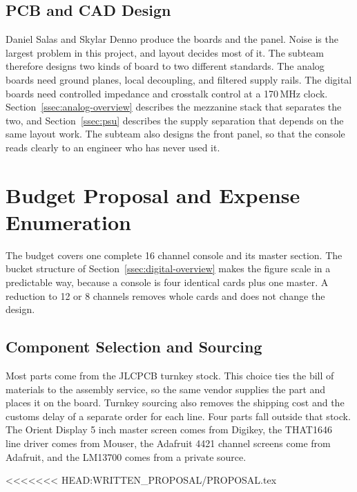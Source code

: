 \documentclass[11pt, letterpaper,titlepage]{article}
\begin{document}
\subsection{PCB and CAD Design}
\label{ssec:task-pcb}

Daniel Salas and Skylar Denno produce the boards and the panel. Noise is the
largest problem in this project, and layout decides most of it. The subteam
therefore designs two kinds of board to two different standards. The analog
boards need ground planes, local decoupling, and filtered supply rails. The
digital boards need controlled impedance and crosstalk control at a 170\,MHz
clock. Section~\ref{ssec:analog-overview} describes the mezzanine stack that separates the two, and
Section~\ref{ssec:psu} describes the supply separation that depends on the same
layout work. The subteam also designs the front panel, so that the console reads
clearly to an engineer who has never used it.


\newpage
\section{Budget Proposal and Expense Enumeration}


\label{sec:budget}

The budget covers one complete 16 channel console and its master section.
The bucket structure of Section~\ref{ssec:digital-overview} makes the figure scale in a predictable
way, because a console is four identical cards plus one master. A reduction to
12 or 8 channels removes whole cards and does not change the design.

\subsection{Component Selection and Sourcing}
\label{ssec:budget-parts}

Most parts come from the JLCPCB turnkey stock. This choice ties the bill of
materials to the assembly service, so the same vendor supplies the part and
places it on the board. Turnkey sourcing also removes the shipping cost and the
customs delay of a separate order for each line. Four parts fall outside that
stock. The Orient Display 5 inch master screen comes from Digikey, the THAT1646~\cite{that1646}
line driver comes from Mouser, the Adafruit 4421 channel screens come from
Adafruit, and the LM13700 comes from a private source.

<<<<<<< HEAD:WRITTEN_PROPOSAL/PROPOSAL.tex
\end{document}
